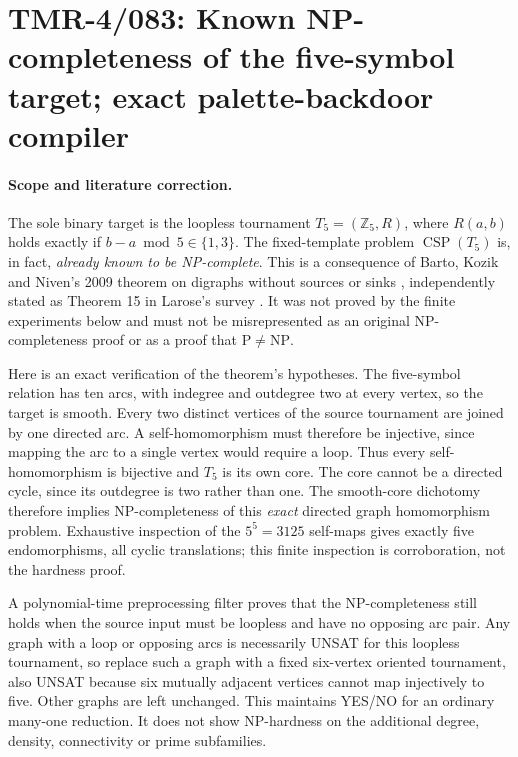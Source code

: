 \documentclass[11pt]{article}
\begin{document}
\section*{TMR-4/083: Known NP-completeness of the five-symbol target; exact palette-backdoor compiler}

\paragraph{Scope and literature correction.}
The sole binary target is the loopless tournament
$T_5=(\mathbb Z_5,R)$, where $R(a,b)$ holds exactly if
$b-a\bmod 5\in\{1,3\}$.  The fixed-template problem
$\operatorname{CSP}(T_5)$ is, in fact, \emph{already known to be
NP-complete}. This is a consequence of Barto, Kozik and Niven's
2009 theorem on digraphs without sources or sinks
\cite{bartokozikniven2009}, independently stated as Theorem 15
in Larose's survey \cite{larose2017}. It was not proved by
the finite experiments below and must not be misrepresented
as an original NP-completeness proof or as a proof that
$\mathrm P\ne\mathrm{NP}$.

Here is an exact verification of the theorem's hypotheses.
The five-symbol relation has ten arcs, with indegree and
outdegree two at every vertex, so the target is smooth.
Every two distinct vertices of the source tournament
are joined by one directed arc. A self-homomorphism
must therefore be injective, since mapping the arc to
a single vertex would require a loop. Thus every
self-homomorphism is bijective and $T_5$ is its own core.
The core cannot be a directed cycle, since its outdegree
is two rather than one. The smooth-core dichotomy therefore
implies NP-completeness of this \emph{exact} directed graph
homomorphism problem. Exhaustive inspection of the $5^5=3125$
self-maps gives exactly five endomorphisms, all cyclic
translations; this finite inspection is corroboration,
not the hardness proof.

A polynomial-time preprocessing filter proves that the
NP-completeness still holds when the source input must be
loopless and have no opposing arc pair. Any graph with a
loop or opposing arcs is necessarily UNSAT for this loopless
tournament, so replace such a graph with a fixed six-vertex
oriented tournament, also UNSAT because six mutually adjacent
vertices cannot map injectively to five. Other graphs
are left unchanged. This maintains YES/NO for an ordinary
many-one reduction. It does not show NP-hardness on the
additional degree, density, connectivity or prime subfamilies.
\end{document}
